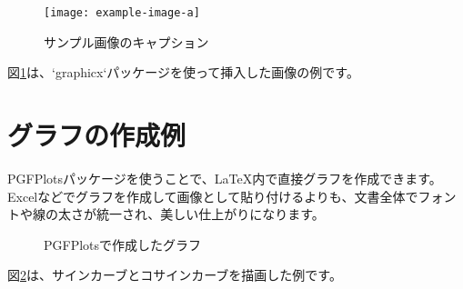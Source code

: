 \documentclass[10.5pt]{jsarticle}
\begin{document}
\begin{figure}[H] %
    \centering
    \texttt{[image: example-image-a]} 
    \caption{サンプル画像のキャプション}
    \label{fig:sample-image}
\end{figure}

図\ref{fig:sample-image}は、`graphicx`パッケージを使って挿入した画像の例です。

\section{グラフの作成例}

PGFPlotsパッケージを使うことで、LaTeX内で直接グラフを作成できます。
Excelなどでグラフを作成して画像として貼り付けるよりも、文書全体でフォントや線の太さが統一され、美しい仕上がりになります。

\begin{figure}[H]
    \centering
    \caption{PGFPlotsで作成したグラフ}
    \label{fig:sample-graph}
\end{figure}

図\ref{fig:sample-graph}は、サインカーブとコサインカーブを描画した例です。
\end{document}

